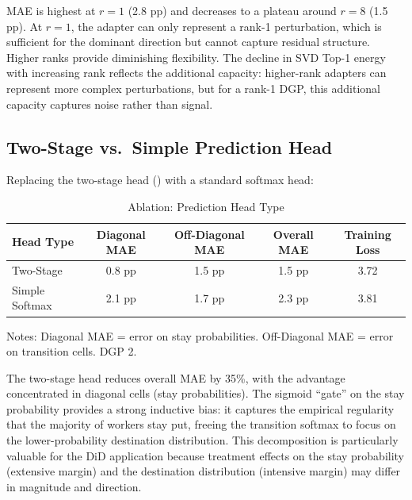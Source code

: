 \documentclass[12pt]{article}
\begin{document}
MAE is highest at $r = 1$ (2.8 pp) and decreases to a plateau around $r = 8$ (1.5 pp). At $r = 1$, the adapter can only represent a rank-1 perturbation, which is sufficient for the dominant direction but cannot capture residual structure. Higher ranks provide diminishing flexibility. The decline in SVD Top-1 energy with increasing rank reflects the additional capacity: higher-rank adapters can represent more complex perturbations, but for a rank-1 DGP, this additional capacity captures noise rather than signal.

\subsection{Two-Stage vs.\ Simple Prediction Head}

Replacing the two-stage head () with a standard softmax head:

\begin{table}[H]
\centering
\caption{Ablation: Prediction Head Type}
\label{tab:ablation_head}
\begin{threeparttable}
\begin{tabular}{lcccc}
\toprule
Head Type & Diagonal MAE & Off-Diagonal MAE & Overall MAE & Training Loss \\
\midrule
Two-Stage & 0.8 pp & 1.5 pp & 1.5 pp & 3.72 \\
Simple Softmax & 2.1 pp & 1.7 pp & 2.3 pp & 3.81 \\
\bottomrule
\end{tabular}
\begin{tablenotes}[flushleft]
\small
\item Notes: Diagonal MAE = error on stay probabilities. Off-Diagonal MAE = error on transition cells. DGP 2.
\end{tablenotes}
\end{threeparttable}
\end{table}

The two-stage head reduces overall MAE by 35\%, with the advantage concentrated in diagonal cells (stay probabilities). The sigmoid ``gate'' on the stay probability provides a strong inductive bias: it captures the empirical regularity that the majority of workers stay put, freeing the transition softmax to focus on the lower-probability destination distribution. This decomposition is particularly valuable for the DiD application because treatment effects on the stay probability (extensive margin) and the destination distribution (intensive margin) may differ in magnitude and direction.
\end{document}
